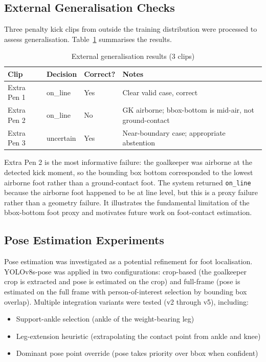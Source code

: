 \documentclass[12pt,a4paper,twoside]{article}
\begin{document}
\subsection{External Generalisation Checks}

Three penalty kick clips from outside the training distribution were processed
to assess generalisation. Table~\ref{tab:external} summarises the results.

\begin{table}[H]
  \centering
  \caption{External generalisation results (3 clips)}
  \label{tab:external}
  \begin{tabular}{llll}
    \toprule
    Clip & Decision & Correct? & Notes \\
    \midrule
    Extra Pen 1 & on\_line & Yes & Clear valid case, correct \\
    Extra Pen 2 & on\_line & No  & GK airborne; bbox-bottom is mid-air, not ground-contact \\
    Extra Pen 3 & uncertain & Yes & Near-boundary case; appropriate abstention \\
    \bottomrule
  \end{tabular}
\end{table}

Extra Pen 2 is the most informative failure: the goalkeeper was airborne at
the detected kick moment, so the bounding box bottom corresponded to the
lowest airborne foot rather than a ground-contact foot. The system returned
\texttt{on\_line} because the airborne foot happened to be at line level,
but this is a proxy failure rather than a geometry failure. It illustrates
the fundamental limitation of the bbox-bottom foot proxy and motivates
future work on foot-contact estimation.

\subsection{Pose Estimation Experiments}

Pose estimation was investigated as a potential refinement for foot localisation.
YOLOv8s-pose was applied in two configurations: crop-based (the goalkeeper crop
is extracted and pose is estimated on the crop) and full-frame (pose is estimated
on the full frame with person-of-interest selection by bounding box overlap).
Multiple integration variants were tested (v2 through v5), including:
\begin{itemize}
  \item Support-ankle selection (ankle of the weight-bearing leg)
  \item Leg-extension heuristic (extrapolating the contact point from ankle and knee)
  \item Dominant pose point override (pose takes priority over bbox when confident)
\end{itemize}
\end{document}
